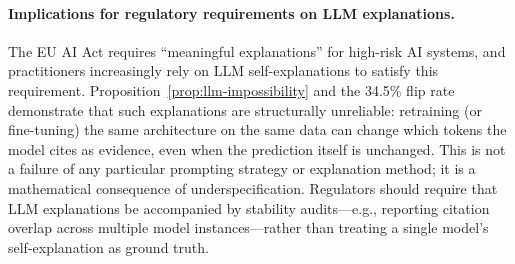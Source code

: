 

\paragraph{Implications for regulatory requirements on LLM explanations.}
The EU AI Act \citep{euaiact2024} requires ``meaningful explanations'' for
high-risk AI systems, and practitioners increasingly rely on LLM
self-explanations to satisfy this requirement.
Proposition~\ref{prop:llm-impossibility} and the 34.5\% flip rate
demonstrate that such explanations are structurally unreliable: retraining
(or fine-tuning) the same architecture on the same data can change which
tokens the model cites as evidence, even when the prediction itself is
unchanged.  This is not a failure of any particular prompting strategy or
explanation method; it is a mathematical consequence of underspecification.
Regulators should require that LLM explanations be accompanied by
stability audits---e.g., reporting citation overlap across multiple model
instances---rather than treating a single model's self-explanation as
ground truth.
